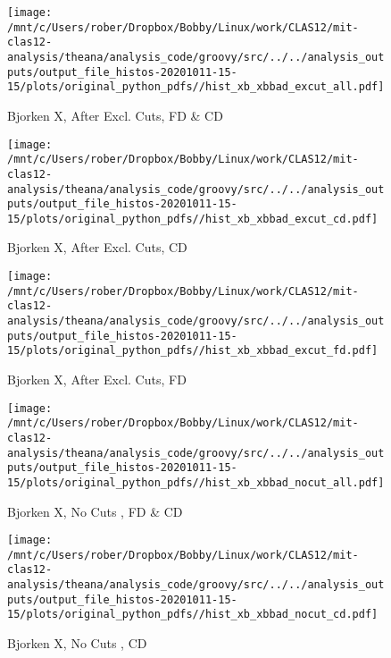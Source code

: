 \documentclass{article}
\begin{document}
\begin{landscape}
    \begin{figure}[h]
        \centering

        \texttt{[image: /mnt/c/Users/rober/Dropbox/Bobby/Linux/work/CLAS12/mit-clas12-analysis/theana/analysis\_code/groovy/src/../../analysis\_outputs/output\_file\_histos-20201011-15-15/plots/original\_python\_pdfs//hist\_xb\_xbbad\_excut\_all.pdf]}
        \captionsetup{textformat=empty,labelformat=blank}
        \caption{Bjorken X, After Excl. Cuts, FD \& CD}
    \end{figure}
    \clearpage
    
    \begin{figure}[h]
        \centering

        \texttt{[image: /mnt/c/Users/rober/Dropbox/Bobby/Linux/work/CLAS12/mit-clas12-analysis/theana/analysis\_code/groovy/src/../../analysis\_outputs/output\_file\_histos-20201011-15-15/plots/original\_python\_pdfs//hist\_xb\_xbbad\_excut\_cd.pdf]}
        \captionsetup{textformat=empty,labelformat=blank}
        \caption{Bjorken X, After Excl. Cuts, CD}
    \end{figure}
    \clearpage
    
    \begin{figure}[h]
        \centering

        \texttt{[image: /mnt/c/Users/rober/Dropbox/Bobby/Linux/work/CLAS12/mit-clas12-analysis/theana/analysis\_code/groovy/src/../../analysis\_outputs/output\_file\_histos-20201011-15-15/plots/original\_python\_pdfs//hist\_xb\_xbbad\_excut\_fd.pdf]}
        \captionsetup{textformat=empty,labelformat=blank}
        \caption{Bjorken X, After Excl. Cuts, FD}
    \end{figure}
    \clearpage
    
    \begin{figure}[h]
        \centering

        \texttt{[image: /mnt/c/Users/rober/Dropbox/Bobby/Linux/work/CLAS12/mit-clas12-analysis/theana/analysis\_code/groovy/src/../../analysis\_outputs/output\_file\_histos-20201011-15-15/plots/original\_python\_pdfs//hist\_xb\_xbbad\_nocut\_all.pdf]}
        \captionsetup{textformat=empty,labelformat=blank}
        \caption{Bjorken X, No Cuts , FD \& CD}
    \end{figure}
    \clearpage
    
    \begin{figure}[h]
        \centering

        \texttt{[image: /mnt/c/Users/rober/Dropbox/Bobby/Linux/work/CLAS12/mit-clas12-analysis/theana/analysis\_code/groovy/src/../../analysis\_outputs/output\_file\_histos-20201011-15-15/plots/original\_python\_pdfs//hist\_xb\_xbbad\_nocut\_cd.pdf]}
        \captionsetup{textformat=empty,labelformat=blank}
        \caption{Bjorken X, No Cuts , CD}
    \end{figure}
    \clearpage
    

\end{landscape}
\end{document}

